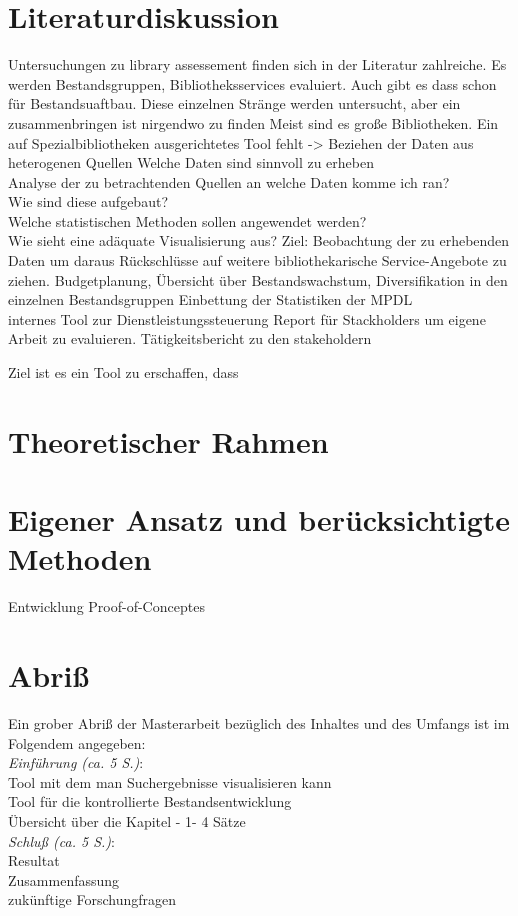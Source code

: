 \documentclass[10pt,a4paper,twocolumn,conference]{IEEEtran}
\begin{document}
\section{Literaturdiskussion}
\blindtext
Untersuchungen zu library assessement finden sich in der Literatur zahlreiche.
Es werden Bestandsgruppen, Bibliotheksservices evaluiert. Auch gibt es dass
schon für Bestandsuaftbau. Diese einzelnen Stränge werden untersucht, aber ein
zusammenbringen ist nirgendwo zu finden
Meist sind es große Bibliotheken. Ein auf Spezialbibliotheken ausgerichtetes
Tool fehlt -> Beziehen der Daten aus heterogenen Quellen
Welche Daten sind sinnvoll zu erheben\\
Analyse der zu betrachtenden Quellen an welche Daten komme ich ran?\\
Wie sind diese aufgebaut?\\
Welche statistischen Methoden sollen angewendet werden?\\
Wie sieht eine adäquate Visualisierung aus?
Ziel: Beobachtung der zu erhebenden Daten um daraus Rückschlüsse auf weitere
bibliothekarische Service-Angebote zu ziehen. Budgetplanung, Übersicht über
Bestandswachstum, Diversifikation in den einzelnen Bestandsgruppen
Einbettung der Statistiken der MPDL\\
internes Tool zur Dienstleistungssteuerung
Report für Stackholders
um eigene Arbeit zu evaluieren.
Tätigkeitsbericht zu den stakeholdern


Ziel ist es ein Tool zu erschaffen, dass 
\section{Theoretischer Rahmen}
\blindtext
\section{Eigener Ansatz und berücksichtigte Methoden}
Entwicklung Proof-of-Conceptes
\section{Abriß}
Ein grober Abriß der Masterarbeit bezüglich des Inhaltes und des Umfangs ist im
Folgendem angegeben:\\
\textit{Einführung (ca. 5 S.)}:\\Tool mit dem man Suchergebnisse visualisieren kann\\
Tool für die kontrollierte Bestandsentwicklung\\Übersicht über die Kapitel - 1-
4 Sätze\\
\textit{Schluß (ca. 5 S.)}:\\
Resultat\\
Zusammenfassung\\
zukünftige Forschungfragen
            

 
\end{document}
